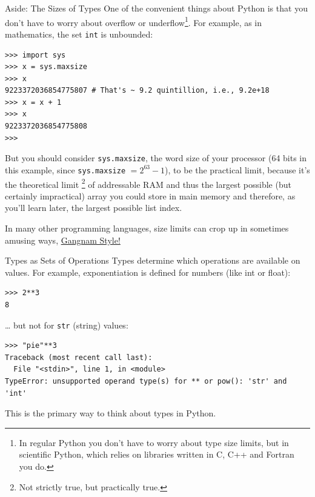 \documentclass[smaller, aspectratio=1610]{beamer}
\begin{document}
\begin{frame}[label={sec:orgcd21d82},fragile]{Aside: The Sizes of Types}
 One of the convenient things about Python is that you don't have to worry about overflow or underflow\footnote{In regular Python you don't have to worry about type size limits, but in scientific Python, which relies on libraries written in C, C++ and Fortran you do.}. For example, as in mathematics, the set \texttt{int} is unbounded:

\lstset{language=Python,label= ,caption= ,captionpos=b,numbers=none}
\begin{lstlisting}
>>> import sys
>>> x = sys.maxsize
>>> x
9223372036854775807 # That's ~ 9.2 quintillion, i.e., 9.2e+18
>>> x = x + 1
>>> x
9223372036854775808
>>>
\end{lstlisting}

But you should consider \texttt{sys.maxsize}, the word size of your processor (64 bits in this example, since \texttt{sys.maxsize} \(= 2^{63} - 1\)), to be the practical limit, because it's the theoretical limit \footnote{Not strictly true, but practically true.} of addressable RAM and thus the largest possible (but certainly impractical) array you could store in main memory and therefore, as you'll learn later, the largest possible list index.

In many other programming languages, size limits can crop up in sometimes amusing ways, \href{https://arstechnica.com/information-technology/2014/12/gangnam-style-overflows-int\_max-forces-youtube-to-go-64-bit/}{Gangnam Style!}
\end{frame}

\begin{frame}[label={sec:org0e4322d},fragile]{Types as Sets of Operations}
 Types determine which operations are available on values. For example, exponentiation is defined for numbers (like int or float):

\lstset{language=Python,label= ,caption= ,captionpos=b,numbers=none}
\begin{lstlisting}
>>> 2**3
8
\end{lstlisting}

\ldots{} but not for \texttt{str} (string) values:

\lstset{language=Python,label= ,caption= ,captionpos=b,numbers=none}
\begin{lstlisting}
>>> "pie"**3
Traceback (most recent call last):
  File "<stdin>", line 1, in <module>
TypeError: unsupported operand type(s) for ** or pow(): 'str' and 'int'
\end{lstlisting}

This is the primary way to think about types in Python.
\end{frame}
\end{document}
